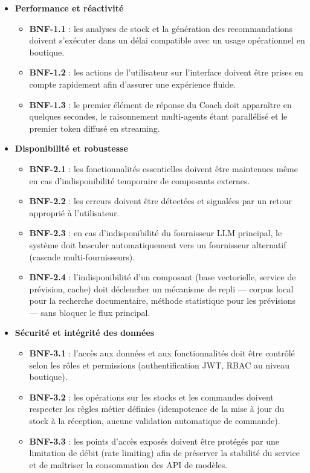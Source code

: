 \begin{itemize}[label=--]
    \item \textbf{Performance et réactivité}
    \begin{itemize}[label=$\bullet$]
        \item \textbf{BNF-1.1} : les analyses de stock et la génération des recommandations doivent s'exécuter dans un délai compatible avec un usage opérationnel en boutique.
        \item \textbf{BNF-1.2} : les actions de l'utilisateur sur l'interface doivent être prises en compte rapidement afin d'assurer une expérience fluide.
        \item \textbf{BNF-1.3} : le premier élément de réponse du Coach doit apparaître en quelques secondes, le raisonnement multi-agents étant parallélisé et le premier token diffusé en streaming.
    \end{itemize}

    \item \textbf{Disponibilité et robustesse}
    \begin{itemize}[label=$\bullet$]
        \item \textbf{BNF-2.1} : les fonctionnalités essentielles doivent être maintenues même en cas d'indisponibilité temporaire de composants externes.
        \item \textbf{BNF-2.2} : les erreurs doivent être détectées et signalées par un retour approprié à l'utilisateur.
        \item \textbf{BNF-2.3} : en cas d'indisponibilité du fournisseur LLM principal, le système doit basculer automatiquement vers un fournisseur alternatif (cascade multi-fournisseurs).
        \item \textbf{BNF-2.4} : l'indisponibilité d'un composant (base vectorielle, service de prévision, cache) doit déclencher un mécanisme de repli — corpus local pour la recherche documentaire, méthode statistique pour les prévisions — sans bloquer le flux principal.
    \end{itemize}

    \item \textbf{Sécurité et intégrité des données}
    \begin{itemize}[label=$\bullet$]
        \item \textbf{BNF-3.1} : l'accès aux données et aux fonctionnalités doit être contrôlé selon les rôles et permissions (authentification JWT, RBAC au niveau boutique).
        \item \textbf{BNF-3.2} : les opérations sur les stocks et les commandes doivent respecter les règles métier définies (idempotence de la mise à jour du stock à la réception, aucune validation automatique de commande).
        \item \textbf{BNF-3.3} : les points d'accès exposés doivent être protégés par une limitation de débit (rate limiting) afin de préserver la stabilité du service et de maîtriser la consommation des API de modèles.
    \end{itemize}


\end{itemize}

